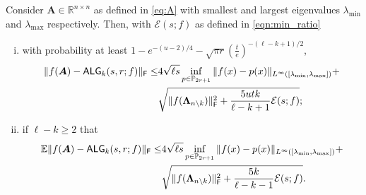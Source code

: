 
\begin{theorem}\label{theorem:krylov_aware}
Consider $\bm{A} \in \mathbb{R}^{n \times n}$ as defined in \eqref{eq:A} with smallest and largest eigenvalues $\lambda_{\min}$ and $\lambda_{\max}$ respectively.
Then, with $\mathcal{E}(s;f)$ %
as defined in \cref{eqn:min_ratio} %
\begin{enumerate}[(i)]
        \item with probability at least $1-e^{-(u-2)/4} - \sqrt{\pi r} \left(\frac{t}{e}\right)^{-(\ell -k + 1)/2}$, %
        \begin{align*}
        \|f(\bm{A}) - \ALG_k(s,r;f) \|_{\F} \leq &4\sqrt{\ell s}  \inf\limits_{p \in \mathbb{P}_{2r+1}}\|f(x)-p(x)\|_{L^{\infty}([\lambda_{\min},\lambda_{\max}])}+\\%
        &\sqrt{\|f(\bm{\Lambda}_{n \setminus k })\|_{\F}^2 +  \frac{5ut k}{\ell - k + 1} \mathcal{E}(s;f)};
        \end{align*}\label{item:krylov_aware_tailbound}
        \item if $\ell -k \geq 2$ that
        \begin{align*}
        \mathbb{E}\|f(\bm{A}) - \ALG_k(s,r;f) \|_{\F} \leq &4\sqrt{\ell s}  \inf\limits_{p \in \mathbb{P}_{2r+1}}\|f(x)-p(x)\|_{L^{\infty}([\lambda_{\min},\lambda_{\max}])}+\\%
        &\sqrt{\|f(\bm{\Lambda}_{n \setminus k })\|_{\F}^2 +  \frac{5k}{\ell - k - 1} \mathcal{E}(s;f)}.        \end{align*}\label{item:krylov_aware_expectationbound}
    \end{enumerate}
\end{theorem}

